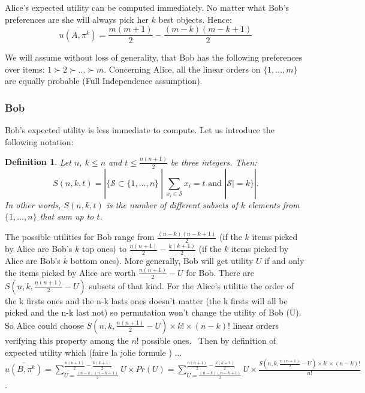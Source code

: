 \documentclass[a4paper, english, 10pt]{article}
\newtheorem{definition}{Definition}
\begin{document}
\label{AliceTh}
Alice's expected utility can be computed immediately. No matter what
Bob's preferences are she will always pick her $k$ best objects. Hence:
\[
  \overline{u(A, \pi^k)} = \frac{m(m+1)}{2} - \frac{(m-k)(m-k+1)}{2}
\]

We will assume without loss of generality, that Bob has the following
preferences over items: $1 \succ 2 \succ ... \succ m$. Concerning
Alice, all the linear orders on $\{ 1, ..., m \}$ are equally probable
(Full Independence assumption).

\subsubsection{Bob}
\label{BobTh}

Bob's expected utility is less immediate to compute. Let us introduce the following
notation:

\begin{definition}
  Let $n$, $k \leq n$ and $t \leq \frac{n(n+1)}{2}$ be three
  integers. Then:
  \[
    S(n, k, t) = \left|\{\mathcal{S} \subset \{1, \dots, n\}\ |\ \sum_{x_i \in \mathcal{S}} x_i = t \text{ and } |\mathcal{S}| = k\}\right|.
  \]
  In other words, $S(n, k, t)$ is the number of different subsets of
  $k$ elements from $\{1, \dots, n\}$ that sum up to $t$.
\end{definition}


The possible utilities for Bob range from $\frac{(n-k)(n-k+1)}{2}$ (if
the $k$ items picked by Alice are Bob's $k$ top ones) to
$\frac{n(n+1)}{2} - \frac{k(k+1)}{2}$ (if the $k$ items picked by
Alice are Bob's $k$ bottom ones). More generally, Bob will get utility
$U$ if and only the items picked by Alice are worth
$\frac{n(n+1)}{2} - U$ for Bob. There are 
$S(n, k, \frac{n(n+1)}{2} - U)$ subsets of that kind. 
For the Alice's utilitie the order of the k firsts ones and the n-k lasts ones  doesn't matter (the k firsts will all be picked and the n-k last not) so permutation won't change the utility of Bob (U).
So Alice could choose $S(n, k, \frac{n(n+1)}{2} - U) \times k! \times (n-k)!$ linear orders verifying this property among the $n!$ possible ones. \
Then by definition of expected utility which (faire la jolie formule ) ... \
 $\overline{u(B, \pi^k)} =
{\sum_{U = \frac{(n-k)(n-k+1)}{2} }^{\frac{n(n+1)}{2} - \frac{k(k+1)}{2}} U \times Pr(U)} = {\sum_{U = \frac{(n-k)(n-k+1)}{2} }^{\frac{n(n+1)}{2} - \frac{k(k+1)}{2}} U \times \frac{ S(n, k, \frac{n(n+1)}{2} - U) \times k! \times (n-k)!}{n!}} $
.
\end{document}
